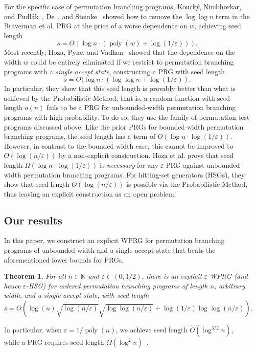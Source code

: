 \documentclass[11pt]{article}
\numberwithin{equation}{section}
\newtheorem{theorem}{Theorem}[section]
\theoremstyle{definition}
\theoremstyle{plain}
\newcommand{\N}{\mathbb N}
\newcommand{\tO}{\widetilde{O}}
\newcommand{\eps}{\varepsilon}
\newcommand{\poly}{\operatorname{poly}}
\begin{document}
	For the specific case of permutation branching programs, Kouck{\'y}, Nimbhorkar, and Pudl{\'a}k~\cite{KouckyNiPu11}, De~\cite{De11}, and Steinke~\cite{Steinke12}
	showed how to remove the $\log\log n$ term in the Braverman et al. PRG at the price of a worse dependence on $w$, achieving seed length
	$$s=O(\log n\cdot(\poly(w)+\log(1/\eps))).$$
	Most recently, Hoza, Pyne, and Vadhan~\cite{HozaPyVa21} showed that the dependence on the width $w$ could be entirely eliminated if we restrict to permutation branching programs with a \emph{single accept state}, constructing a PRG with seed length
	$$s=O(\log n\cdot (\log\log n+\log(1/\eps)).$$
	In particular, they show that this	seed length is provably better than what is achieved by the Probabilistic Method; that is, a random function with seed length $o(n)$ fails to be a PRG for unbounded-width permutation branching programs with high probability. To do so, they use the family of permutation test programs discussed above.
	Like the prior PRGs for bounded-width permutation branching programs, the seed length has a term of $O(\log n\cdot \log(1/\eps))$.  However, in contrast to the bounded-width case, this cannot be improved to $O(\log(n/\eps))$ by a non-explicit construction.  Hoza et al. prove that seed length $\Omega(\log n \cdot \log(1/\eps))$ is \emph{necessary} for any $\eps$-PRG against unbounded-width permutation branching programs.  For hitting-set generators (HSGs), they show that seed length $O(\log(n/\eps))$ is possible via the Probabilistic Method, thus leaving an explicit construction as an open problem. 
	
\subsection{Our results}
In this paper, we construct an explicit WPRG for permutation branching programs of unbounded width and a single accept state that beats the aforementioned lower bounds for PRGs. %

\begin{theorem}
\label{thm:cycle}
For all $n\in \N$ and $\eps \in (0,1/2)$, there is an explicit $\eps$-WPRG (and hence $\eps$-HSG) for ordered permutation branching 
programs of length $n$, arbitrary width, and a single accept state, with seed length
$$s=O\left(\log(n)\sqrt{\log(n/\eps)}\sqrt{\log\log(n/\eps)}+\log(1/\eps)\log\log(n/\eps)\right).$$
\end{theorem}
In particular, when $\eps=1/\poly(n)$, we achieve seed length $\tO(\log^{3/2} n)$, while
a PRG requires seed length $\Omega(\log^2 n)$~\cite{HozaPyVa21}.
\end{document}
